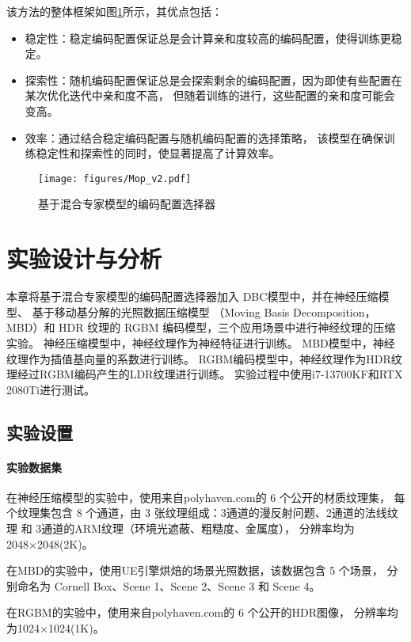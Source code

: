 该方法的整体框架如图\ref{fig:Mop}所示，其优点包括：
\begin{itemize}
\item 稳定性：稳定编码配置保证总是会计算亲和度较高的编码配置，使得训练更稳定。
\item 探索性：随机编码配置保证总是会探索剩余的编码配置，因为即使有些配置在某次优化迭代中亲和度不高，
但随着训练的进行，这些配置的亲和度可能会变高。
\item 效率：通过结合稳定编码配置与随机编码配置的选择策略，
该模型在确保训练稳定性和探索性的同时，使显著提高了计算效率。
\end{itemize}
\begin{figure}[htbp]
    \centering
    \texttt{[image: figures/Mop\_v2.pdf]}
    \caption{基于混合专家模型的编码配置选择器}
    \label{fig:Mop}
\end{figure}


\section{实验设计与分析}

本章将基于混合专家模型的编码配置选择器加入
DBC模型中，并在神经压缩模型、
基于移动基分解的光照数据压缩模型
\cite{silvennoinen2021moving}（Moving Basis Decomposition，MBD）和
HDR 纹理的 RGBM 编码模型，三个应用场景中进行神经纹理的压缩实验。
神经压缩模型中，神经纹理作为神经特征进行训练。
MBD模型中，神经纹理作为插值基向量的系数进行训练。
RGBM编码模型中，神经纹理作为HDR纹理经过RGBM编码产生的LDR纹理进行训练。
实验过程中使用i7-13700KF和RTX 2080Ti进行测试。

\subsection{实验设置}

\paragraph{实验数据集}

在神经压缩模型的实验中，使用来自polyhaven.com\cite{PolyHaven}的 6 个公开的材质纹理集，
每个纹理集包含 8 个通道，由 3 张纹理组成：3通道的漫反射问题、2通道的法线纹理 和 3通道的ARM纹理（环境光遮蔽、粗糙度、金属度），
分辨率均为2048×2048(2K)。

在MBD的实验中，使用UE引擎烘焙的场景光照数据，该数据包含 5 个场景，
分别命名为 Cornell Box、Scene 1、Scene 2、Scene 3 和 Scene 4。

在RGBM的实验中，使用来自polyhaven.com\cite{PolyHaven}的 6 个公开的HDR图像，
分辨率均为1024×1024(1K)。

